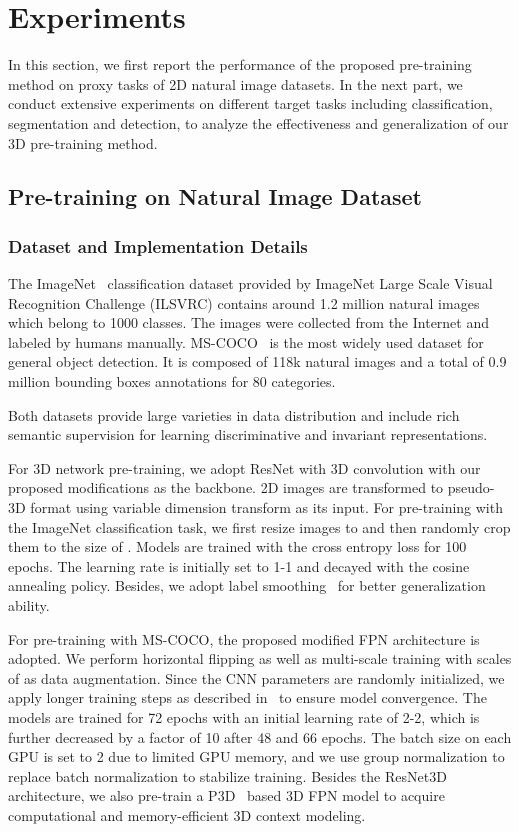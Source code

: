 \documentclass[journal,twoside,web]{ieeecolor}
\begin{document}
\section{Experiments}



In this section, we first report the performance of the proposed pre-training method on proxy tasks of 2D natural image datasets.
In the next part, we conduct extensive experiments on different target tasks including classification, segmentation and detection, to analyze the effectiveness and generalization of our 3D pre-training method. 


\subsection{Pre-training on Natural Image Dataset}
\subsubsection{Dataset and Implementation Details}
The ImageNet~\cite{ILSVRC15} classification dataset provided by ImageNet Large Scale Visual Recognition Challenge (ILSVRC) contains around 1.2 million natural images which belong to 1000 classes.
The images were collected from the Internet and labeled by humans manually. MS-COCO~\cite{lin2014microsoft} is the most widely used dataset for general object detection. It is composed of 118k natural images and a total of 0.9 million bounding boxes annotations for 80 categories. 

Both datasets provide large varieties in data distribution and include rich semantic supervision for learning discriminative and invariant representations. 

For 3D network pre-training, we adopt ResNet with 3D convolution with our proposed modifications as the backbone. 2D images are transformed to pseudo-3D format using variable dimension transform as its input. For pre-training with the ImageNet classification task, we first resize images to  and then randomly crop them to the size of . Models are trained with the cross entropy loss for 100 epochs. 
The learning rate is initially set to 1-1 and decayed with the cosine annealing policy. Besides, we adopt label smoothing~\cite{szegedy2016rethinking} for better generalization ability.


For pre-training with MS-COCO, the proposed modified FPN architecture is adopted. We perform horizontal flipping as well as multi-scale training with scales of  as data augmentation. Since the CNN parameters are randomly initialized, we apply longer training steps as described in~\cite{he2019rethinking} to ensure model convergence. The models are trained for 72 epochs with an initial learning rate of 2-2, which is further decreased by a factor of 10 after 48 and 66 epochs. The batch size on each GPU is set to 2 due to limited GPU memory, and we use group normalization to replace batch normalization to stabilize training. Besides the ResNet3D architecture, we also pre-train a P3D~\cite{qiu2017learning} based 3D FPN model to acquire computational and memory-efficient 3D context modeling.
\end{document}

